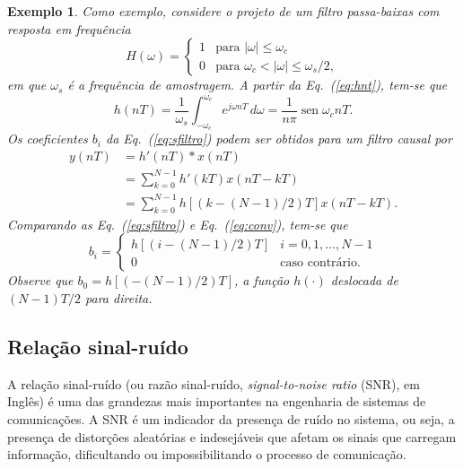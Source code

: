 \documentclass[12pt,addpoints]{exam}
\newtheorem{exemplo}{Exemplo}[section]
\begin{document}
\begin{exemplo} \label{ex:1}
    Como exemplo, considere o projeto de um filtro passa-baixas com resposta em frequência
    \begin{equation} \label{eq:porta}
        H(\omega) = \begin{cases}
        	1 & \text{para } |\omega| \leq \omega_c              \\
        	0 & \text{para } \omega_c < |\omega| \leq \omega_s/2,
        \end{cases}
    \end{equation}
    em que $\omega_s$ é a frequência de amostragem. A partir da Eq.~(\ref{eq:hnt}), tem-se que
    \begin{equation} \label{eq:hntfpb}
        h(nT) = \frac{1}{\omega_s} \int_{-\omega_c}^{\omega_c} e^{j\omega nT} \, d\omega = \frac{1}{n\pi} \operatorname{sen}{\omega_cnT}.
    \end{equation}
    Os coeficientes $b_i$ da Eq.~(\ref{eq:sfiltro}) podem ser obtidos para um filtro causal por
    \begin{equation} \label{eq:conv}
        \begin{split}
        	y(nT) & = h'(nT) * x(nT)                               \\
        	      & = \sum_{k=0}^{N-1} h'(kT)x(nT - kT)            \\
        	      & = \sum_{k=0}^{N-1} h[(k- (N-1)/2)T]x(nT - kT).
        \end{split}
    \end{equation}
    Comparando as Eq.~(\ref{eq:sfiltro}) e Eq.~(\ref{eq:conv}), tem-se que
    \begin{equation} \label{eq:bi}
        b_i = \begin{cases}
        	h[(i - (N-1)/2)T] & i = 0, 1, \ldots, N-1  \\
        	0                 & \text{caso contrário}.
        \end{cases}
    \end{equation}
    Observe que $b_0 = h[(-(N-1)/2)T]$, a função $h(\cdot)$ deslocada de $(N-1)T/2$ para direita.
\end{exemplo}

\subsection{Relação sinal-ruído} \label{sec:theorySNR}
A relação sinal-ruído (ou razão sinal-ruído, \textit{signal-to-noise ratio} (SNR), em Inglês) é uma das grandezas mais importantes na engenharia de sistemas de comunicações. A SNR é um indicador da presença de ruído no sistema, ou seja, a presença de distorções aleatórias e indesejáveis que afetam os sinais que carregam informação, dificultando ou impossibilitando o processo de comunicação.
\end{document}
